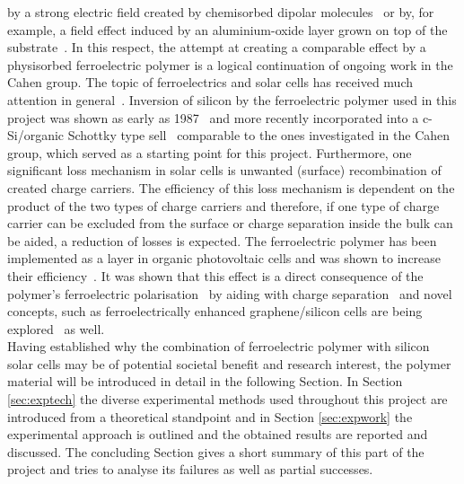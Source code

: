 by a strong electric field created by chemisorbed dipolar molecules~\cite{ann_inversion} or by, for example, a field effect induced by an aluminium-oxide layer grown on top of the substrate~\cite{ann_inversion2}. In this respect, the attempt at creating a comparable effect by a physisorbed ferroelectric polymer is a logical continuation of ongoing work in the Cahen group. The topic of ferroelectrics and solar cells has received much attention in general~\cite{yuan_ferrooverview}. Inversion of silicon by the ferroelectric polymer used in this project was shown as early as 1987~\cite{langlois_inversion} and more recently incorporated into a c-Si/organic Schottky type sell~\cite{liu_THEpaper} comparable to the ones investigated in the Cahen group, which served as a starting point for this project. Furthermore, one significant loss mechanism in solar cells is unwanted (surface) recombination of created charge carriers. The efficiency of this loss mechanism is dependent on the product of the two types of charge carriers and therefore, if one type of charge carrier can be excluded from the surface or charge separation inside the bulk can be aided, a reduction of losses is expected. The ferroelectric polymer has been implemented as a  layer in organic photovoltaic cells and was shown to increase their efficiency~\cite{asadi_opvenhancement}. It was shown that this effect is a direct consequence of the polymer's ferroelectric polarisation~\cite{yuan_opvenhancement} by aiding with charge separation~\cite{nalwa_enhancedopvchargesep} and novel concepts, such as ferroelectrically enhanced graphene/silicon cells are being explored~\cite{yu_gr-fe-si-cell} as well.\\
Having established why the combination of ferroelectric polymer with silicon solar cells may be of potential societal benefit and research interest, the polymer material will be introduced in detail in the following Section. In Section \ref{sec:exptech} the diverse experimental methods used throughout this project are introduced from a theoretical standpoint and in Section \ref{sec:expwork} the experimental approach is outlined and the obtained results are reported and discussed. The concluding Section gives a short summary of this part of the project and tries to analyse its failures as well as partial successes.


